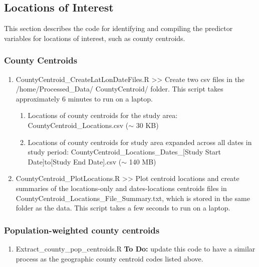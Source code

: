 \subsection{Locations of Interest}

This section describes the code for identifying and compiling the predictor variables for locations of interest, such as county centroids.

\subsubsection{County Centroids}

\begin{enumerate}

\item CountyCentroid\_CreateLatLonDateFiles.R >>  Create two csv files in the  /home/Processed\_Data/ CountyCentroid/ folder. This script takes approximately 6 minutes to run on a laptop.
	\begin{enumerate}
		\item Locations of county centroids for the study area: CountyCentroid\_Locations.csv ($\sim$ 30 KB)
		\item Locations of county centroids for study area expanded across all dates in study period: CountyCentroid\_Locations\_Dates\_[Study Start Date]to[Study End Date].csv ($\sim$ 140 MB)
	\end{enumerate}

\item CountyCentroid\_PlotLocations.R >> Plot centroid locations and create summaries of the locations-only and dates-locations centroids files in CountyCentroid\_Locations\_File\_Summary.txt, which is stored in the same folder as the data. This script takes a few seconds to run on a laptop.

\end{enumerate}

\subsubsection{Population-weighted county centroids}

\begin{enumerate}
	\item Extract\_county\_pop\_centroids.R \textbf{To Do:} update this code to have a similar process as the geographic county centroid codes listed above. 
\end{enumerate}


